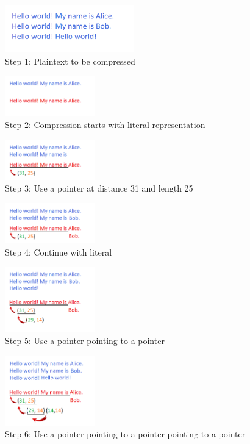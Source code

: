 \begin{figure}[H] \caption{Step 1: Plaintext to be compressed} \centering
\includegraphics[width=0.5\textwidth]{diagrams/lz77_1.png}\end{figure}
\begin{figure}[H] \caption{Step 2: Compression starts with literal
representation} \centering
\includegraphics[width=0.35\textwidth]{diagrams/lz77_2.png}\end{figure}
\begin{figure}[H] \caption{Step 3: Use a pointer at distance 31 and length 25}
\centering
\includegraphics[width=0.35\textwidth]{diagrams/lz77_3.png}\end{figure}
\begin{figure}[H] \caption{Step 4: Continue with literal} \centering
\includegraphics[width=0.35\textwidth]{diagrams/lz77_4.png}\end{figure}
\begin{figure}[H] \caption{Step 5: Use a pointer pointing to a pointer}
\centering
\includegraphics[width=0.35\textwidth]{diagrams/lz77_5.png}\end{figure}
\begin{figure}[H] \caption{Step 6: Use a pointer pointing to a pointer pointing
to a pointer} \centering
\includegraphics[width=0.35\textwidth]{diagrams/lz77_6.png}\end{figure}


